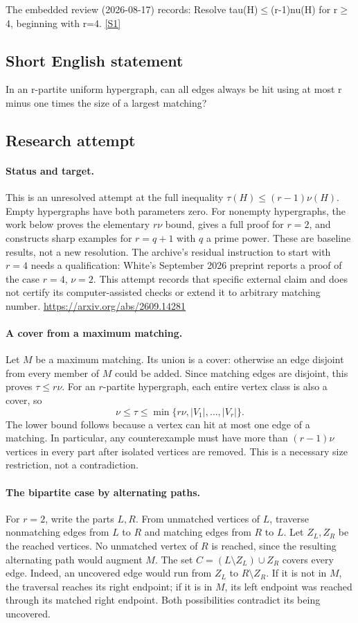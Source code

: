 \documentclass[11pt,a4paper]{article}
\newcommand{\sref}[2]{\hyperlink{source:#1:#2}{[S#2]}}
\begin{document}
The embedded review (2026-08-17) records: Resolve tau(H)\ensuremath{≤}(r-1)nu(H) for r\ensuremath{≥}4, beginning with r=4. \sref{statement}{1}

\subsection{Short English statement}

In an r-partite uniform hypergraph, can all edges always be hit using at most r minus one times the size of a largest matching?

\subsection{Research attempt}
\paragraph{Status and target.}
This is an unresolved attempt at the full inequality
$\tau(H)\leq(r-1)\nu(H)$. Empty hypergraphs have both parameters zero.
For nonempty hypergraphs, the work below proves the elementary $r\nu$
bound, gives a full proof for $r=2$, and constructs sharp examples for
$r=q+1$ with $q$ a prime power. These are baseline results, not a new
resolution. The archive's residual instruction to start with $r=4$
needs a qualification: White's September 2026 preprint reports a proof
of the case $r=4$, $\nu=2$. This attempt records that specific external
claim and does not certify its computer-assisted checks or extend it to
arbitrary matching number. \url{https://arxiv.org/abs/2609.14281}

\paragraph{A cover from a maximum matching.}
Let $M$ be a maximum matching. Its union is a cover: otherwise an edge
disjoint from every member of $M$ could be added. Since matching edges
are disjoint, this proves $\tau\leq r\nu$. For an $r$-partite hypergraph,
each entire vertex class is also a cover, so
\[
 \nu\leq\tau\leq\min\{r\nu,|V_1|,\ldots,|V_r|\}.
\]
The lower bound follows because a vertex can hit at most one edge of a
matching. In particular, any counterexample must have more than
$(r-1)\nu$ vertices in every part after isolated vertices are removed.
This is a necessary size restriction, not a contradiction.

\paragraph{The bipartite case by alternating paths.}
For $r=2$, write the parts $L,R$. From unmatched vertices of $L$, traverse
nonmatching edges from $L$ to $R$ and matching edges from $R$ to $L$.
Let $Z_L,Z_R$ be the reached vertices. No unmatched vertex of $R$ is
reached, since the resulting alternating path would augment $M$.
The set $C=(L\setminus Z_L)\cup Z_R$ covers every edge. Indeed, an
uncovered edge would run from $Z_L$ to $R\setminus Z_R$. If it is not
in $M$, the traversal reaches its right endpoint; if it is in $M$, its
left endpoint was reached through its matched right endpoint. Both
possibilities contradict its being uncovered.
\end{document}
